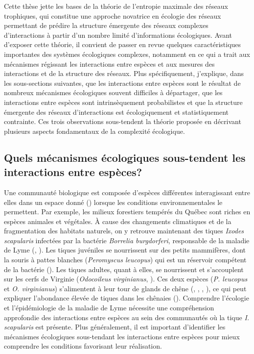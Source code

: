 Cette thèse jette les bases de la théorie de l'entropie maximale des réseaux
trophiques, qui constitue une approche novatrice en écologie des réseaux
permettant de prédire la structure émergente des réseaux complexes
d'interactions à partir d'un nombre limité d'informations écologiques. Avant
d'exposer cette théorie, il convient de passer en revue quelques
caractéristiques importantes des systèmes écologiques complexes, notamment en ce
qui a trait aux mécanismes régissant les interactions entre espèces et aux
mesures des interactions et de la structure des réseaux. Plus spécifiquement,
j'explique, dans les sous-sections suivantes, que les interactions entre espèces
sont le résultat de nombreux mécanismes écologiques souvent difficiles à
départager, que les interactions entre espèces sont intrinsèquement
probabilistes et que la structure émergente des réseaux d'interactions est
écologiquement et statistiquement contrainte. Ces trois observations
sous-tendent la théorie proposée en décrivant plusieurs aspects fondamentaux de
la complexité écologique.

\subsection{Quels mécanismes écologiques sous-tendent les interactions entre espèces?} 

Une communauté biologique est composée d'espèces différentes interagissant entre
elles dans un espace donné (\cite{Stroud2015Community}) lorsque les conditions
environnementales le permettent. Par exemple, les milieux forestiers tempérés du
Québec sont riches en espèces animales et végétales. À cause des changements
climatiques et de la fragmentation des habitats naturels, on y retrouve
maintenant des tiques \textit{Ixodes scapularis} infectées par la bactérie
\textit{Borrelia burgdorferi}, responsable de la maladie de Lyme
(\cite{Ogden2009Emergence}, \cite{Simon2014Climate}). Les tiques juvéniles se
nourrissent sur des petits mammifères, dont la souris à pattes blanches
(\textit{Peromyscus leucopus}) qui est un réservoir compétent de la bactérie
(\cite{Donahue1987Reservoir}). Les tiques adultes, quant à elles, se nourrissent
et s'accouplent sur les cerfs de Virginie (\textit{Odocoileus virginianus},
\cite{Lane1991Lyme}). Ces deux espèces (\textit{P. leucopus} et \textit{O.
virginianus}) s'alimentent à leur tour de glands de chêne
(\cite{McShea1993Variablea}, \cite{Elkinton1996Interactions},
\cite{Wolff1996Population}, \cite{McShea2000Influence}), ce qui peut expliquer
l'abondance élevée de tiques dans les chênaies (\cite{Ostfeld2006Climate}).
Comprendre l'écologie et l'épidémiologie de la maladie de Lyme nécessite une
compréhension approfondie des interactions entre espèces au sein des communautés
où la tique \textit{I. scapularis} est présente. Plus généralement, il est
important d'identifier les mécanismes écologiques sous-tendant les interactions
entre espèces pour mieux comprendre les conditions favorisant leur réalisation. 

